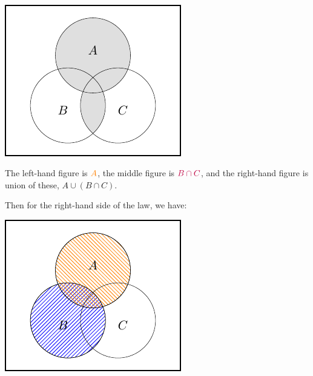 \documentclass[
  a4paper,
]{book}
\theoremstyle{definition}
\theoremstyle{definition}
\theoremstyle{definition}
\theoremstyle{definition}
\theoremstyle{remark}
\begin{document}
~

\begin{center}\includegraphics[width=1\linewidth]{math1710_files/figure-latex/dist3-1} \end{center}

The left-hand figure is \(\color{orange}{A}\), the middle figure is \(\color{purple}{B\cap C}\), and the right-hand figure is union of these, \(A\cup (B\cap C)\).

Then for the right-hand side of the law, we have:

\begin{center}\includegraphics[width=1\linewidth]{math1710_files/figure-latex/dist4-1} \end{center}
\end{document}
